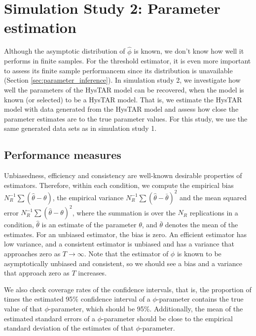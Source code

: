 \documentclass{article}
\begin{document}


\section{Simulation Study 2: Parameter estimation}
\label{sec:simulation_study_2}
Although the asymptotic distribution of $\hat{\phi}$ is known, we don't know how well it performs in finite samples.
For the threshold estimator, it is even more important to assess its finite sample performancem since its distribution is unavailable (Section \ref{sec:parameter_inference}).
In simulation study 2, we investigate how well the parameters of the HysTAR model can be recovered, when the model is known (or selected) to be a HysTAR model. That is, we estimate the HysTAR model with data generated from the HysTAR model and assess how close the parameter estimates are to the true parameter values.
For this study, we use the same generated data sets as in simulation study 1.

\subsection{Performance measures}
Unbiasedness, efficiency and consistency are well-known desirable properties of estimators. Therefore, within each condition, we compute the empirical bias $N_R^{-1} \sum (\hat{\theta} - \theta)$, the empirical variance $N_R^{-1} \sum (\hat{\theta} - \bar{\theta})^2$ and the mean squared error $N_R^{-1} \sum (\hat{\theta} - \theta)^2$, where the summation is over the $N_R$ replications in a condition, $\hat{\theta}$ is an estimate of the parameter $\theta$, and $\bar{\theta}$ denotes the mean of the estimates.
For an unbiased estimator, the bias is zero.
An efficient estimator has low variance, and a consistent estimator is unbiased and has a variance that approaches zero as $T \rightarrow \infty$.
Note that the estimator of $\phi$ is known to be asymptotically unbiased and consistent, so we should see a bias and a variance that approach zero as $T$ increases.

We also check coverage rates of the confidence intervals, that is, the proportion of times the estimated 95\% confidence interval of a $\phi$-parameter contains the true value of that $\phi$-parameter, which should be 95\%. Additionally, the mean of the estimated standard errors of a $\phi$-parameter should be close to the empirical standard deviation of the estimates of that $\phi$-parameter.
\end{document}
